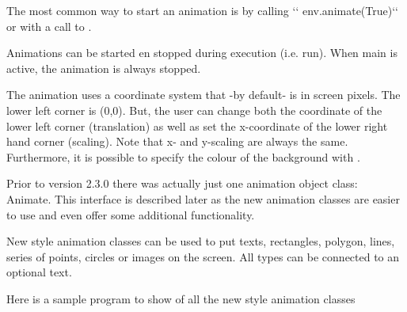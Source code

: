 \documentclass[letterpaper,10pt,english]{sphinxmanual}
\begin{document}
The most common way to start an animation is by calling
{}`{}` env.animate(True){}`{}` or with a call to .

Animations can be started en stopped during execution (i.e. run). When main is active, the animation
is always stopped.

The animation uses a coordinate system that -by default- is in screen pixels. The lower left corner is (0,0).
But, the user can change both the coordinate of the lower left corner (translation) as well as set the x-coordinate
of the lower right hand corner (scaling). Note that x- and y-scaling are always the same. 
Furthermore, it is possible to specify the colour of the background with .

Prior to version 2.3.0 there was actually just one animation object class: Animate. This
interface is described later as the new animation classes are easier to use and even offer some
additional functionality.

New style animation classes can be used to put texts, rectangles, polygon, lines, series of points, circles
or images on the screen. All types can be connected to an optional text.

Here is a sample program to show of all the new style animation classes
\end{document}
